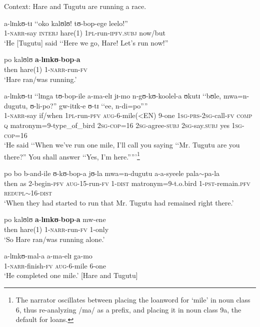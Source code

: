 \begin{exe}
\ex Context: Hare and Tugutu are running a race.
\label{exNarrProg3}
\begin{xlist}
\ex \label{exNarrProg3Sentence1} \gll a-lɪnkʊ-tɪ \textup{\lq\lq}oko kalʊlʊ! tʊ-bop-ege leelo!\textup{''}\\
1-\textsc{narr}-say \phantom{\lq\lq}\textsc{interj} hare(1) \textsc{1pl}-run-\textsc{ipfv.subj} now/but\\
\glt \lq He [Tugutu] said \lq\lq Here we go, Hare! Let's run now!''

\ex\label{exNarrProg3Sentence2} \gll po kalʊlʊ \textbf{a}-\textbf{lɪnkʊ}-\textbf{bop}-\textbf{a}\\
then hare(1) 1-\textsc{narr}-run-\textsc{fv}\\
\glt \lq Hare ran/was running.'

\ex \label{exNarrProg3Sentence3}\gll a-lɪnkʊ-tɪ \textup{\lq\lq}lɪnga tʊ-bop-ile a-ma-elɪ jɪ-mo n-gʊ-kʊ-koolel-a ʊkutɪ \textup{\lq\lq}bʊle, mwa=n-dugutu, ʊ-li-po?\textup{''} gw-itɪk-e ʊ-tɪ \textup{\lq\lq}ee, n-di=po\textup{''{}''}\\
1-\textsc{narr}-say \phantom{\lq\lq}if/when \textsc{1pl}-run-\textsc{pfv} \textsc{aug}-6-mile(<EN) 9-one \textsc{1sg}-\textsc{prs}-\textsc{2sg}-call-\textsc{fv} \textsc{comp} \phantom{\lq\lq}\textsc{q} matronym=9-type\_of\_bird \textsc{2sg}-\textsc{cop}=16 \textsc{2sg}-agree-\textsc{subj} \textsc{2sg}-say.\textsc{subj} \phantom{\lq\lq}yes \textsc{1sg}-\textsc{cop}=16\\
\glt \lq He said \lq\lq When we've run one mile, I'll call you saying \lq\lq Mr. Tugutu are you there?'' You shall answer \lq\lq Yes, I'm here.''{}''{}'\footnote{The narrator oscillates between placing the loanword for \lq mile' in noun class 6, thus re-analyzing /ma/ as a prefix, and placing it in noun class 9a, the default for loans.}

\ex \label{exNarrProg3Sentence4} \gll po bo b-and-ile ʊ-kʊ-bop-a jʊ-la mwa=n-dugutu a-a-syeele pala$\sim$pa-la\\
then as 2-begin-\textsc{pfv} \textsc{aug}-15-run-\textsc{fv} 1-\textsc{dist} matronym=9-t.o.bird 1-\textsc{pst}-remain.\textsc{pfv} \textsc{redupl}$\sim$16-\textsc{dist}\\
\glt  ‎\lq When they had started to run that Mr. Tugutu had remained right there.'

\ex\label{exNarrProg3Sentence5}\gll po kalʊlʊ \textbf{a}-\textbf{lɪnkʊ}-\textbf{bop}-\textbf{a} mw-ene\\
then hare(1) 1-\textsc{narr}-run-\textsc{fv} 1-only\\
\glt \lq So Hare ran/was running alone.'

\ex \label{exNarrProg3Sentence6} \gll a-lɪnkʊ-mal-a a-ma-elɪ ga-mo\\
1-\textsc{narr}-finish-\textsc{fv} \textsc{aug}-6-mile 6-one\\
\glt \lq He completed one mile.' [Hare and Tugutu]
\end{xlist}
\end{exe}

